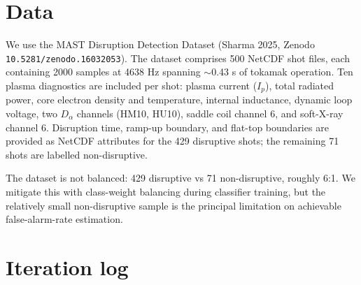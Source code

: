 \documentclass[11pt,letterpaper]{article}
\begin{document}
\section{Data}\label{sec:data}

We use the MAST Disruption Detection Dataset (Sharma 2025, Zenodo
\texttt{10.5281/zenodo.16032053}). The dataset comprises 500 NetCDF
shot files, each containing 2000 samples at 4638 Hz spanning $\sim$0.43
s of tokamak operation. Ten plasma diagnostics are included per shot:
plasma current ($I_p$), total radiated power, core electron density and
temperature, internal inductance, dynamic loop voltage, two
$D_\alpha$ channels (HM10, HU10), saddle coil channel 6, and
soft-X-ray channel 6. Disruption time, ramp-up boundary, and flat-top
boundaries are provided as NetCDF attributes for the 429 disruptive
shots; the remaining 71 shots are labelled non-disruptive.

The dataset is not balanced: 429 disruptive vs 71 non-disruptive,
roughly 6:1. We mitigate this with class-weight balancing during
classifier training, but the relatively small non-disruptive sample is
the principal limitation on achievable false-alarm-rate estimation.

\section{Iteration log}\label{sec:iterations}
\end{document}
